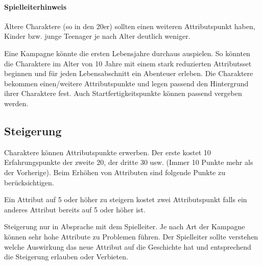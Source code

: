 \documentclass{article}
\begin{document}
\begin{mdframed}[hidealllines=true, backgroundcolor=black!10]
\paragraph{Spielleiterhinweis}

Ältere Charaktere (so in den 20er) sollten einen weiteren Attributspunkt haben, Kinder bzw. junge Teenager je nach
Alter deutlich weniger.

Eine Kampagne könnte die ersten Lebensjahre durchaus auspielen. So könnten die Charaktere im Alter von 10 Jahre
mit einem stark reduzierten Attributsset beginnen und für jeden Lebensabschnitt ein Abenteuer erleben. Die Charaktere
bekommen einen/weitere Attributspunkte und legen passend den Hintergrund ihrer Charaktere fest.
Auch Startfertigkeitspunkte können passend vergeben werden.

\end{mdframed}
\begin{center}
\subsection{Steigerung}
\end{center}

Charaktere können Attributspunkte erwerben. Der erste kostet 10 Erfahrungspunkte der zweite 20, der dritte 30 usw.
(Immer 10 Punkte mehr als der Vorherige). Beim Erhöhen von Attributen sind folgende Punkte zu berücksichtigen.

Ein Attribut auf 5 oder höher zu steigern kostet zwei Attributspunkt falls ein anderes Attribut bereits auf 5
oder höher ist.

Steigerung nur in Absprache mit dem Spielleiter. Je nach Art der Kampagne können sehr hohe Attribute zu Problemen
führen. Der Spielleiter sollte verstehen welche Auswirkung das neue Attribut auf die Geschichte hat und entsprechend
die Steigerung erlauben oder Verbieten.
\end{document}
